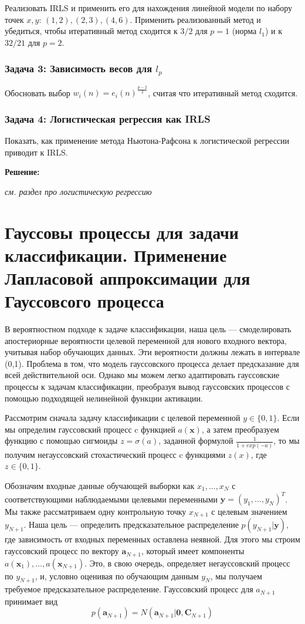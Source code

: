 Реализовать IRLS и применить его для нахождения линейной модели по набору точек $x, y$: $(1, 2), (2, 3), (4, 6)$. Применить реализованный метод и убедиться, чтобы итеративный метод сходится к $3 / 2$ для $p = 1$ (норма $l_1$) и к $32 / 21$ для $p = 2$.

\subsubsection{Задача 3: Зависимость весов для $l_p$}

Обосновать выбор $w_i(n) = e_i(n)^{\frac{p - 2}{2}}$, считая что итеративный метод сходится.

\subsubsection{Задача 4: Логистическая регрессия как IRLS}

Показать, как применение метода Ньютона-Рафсона к логистической регрессии приводит к IRLS.

\textbf{Решение:}

\textit{см. раздел про логистическую регрессию}

\section{Гауссовы процессы для задачи классификации. Применение Лапласовой аппроксимации для Гауссовсого процесса}

В вероятностном подходе к задаче классификации, наша цель — смоделировать апостериорные
вероятности целевой переменной для нового входного вектора, учитывая набор обучающих
данных. Эти вероятности должны лежать в интервале (0,1). Проблема в том, что модель гауссовского процесса делает предсказание для всей действительной оси. Однако мы можем легко
адаптировать гауссовские процессы к задачам классификации, преобразуя вывод
гауссовских процессов с помощью подходящей нелинейной функции активации.

Рассмотрим сначала задачу классификации с целевой переменной $y \in \{0,1\}$. Если мы определим гауссовский процесс c функцией $a(\mathbf{x})$, а затем преобразуем функцию с помощью сигмоиды $z=\sigma(a)$, заданной формулой $\frac{1}{1+exp(-a)}$, то мы получим негауссовский
стохастический процесс c функциями $z(x)$, где $z \in \{0,1\}$.

Обозначим входные данные обучающей выборки как $x_1,...,x_N$ с соответствующими
наблюдаемыми целевыми переменными $\mathbf{y} =(y_1,...,y_N)^T$. Мы также рассматриваем одну контрольную точку
$x_{N+1}$ с целевым значением $y_{N+1}$. Наша цель — определить предсказательное распределение
$p(y_{N+1}|\mathbf{y})$, где зависимость от входных переменных оставлена неявной. Для этого мы строим гауссовский процесс по вектору $\mathbf{a}_{N+1}$, который имеет компоненты $a(\mathbf{x}_1),...,a(\mathbf{x}_{N+1})$. Это, в свою очередь, определяет негауссовский процесс по $y_{N+1}$,
и, условно оценивая по обучающим данным $y_N$, мы получаем требуемое предсказательное распределение. Гауссовский процесс для $a_{N+1}$ принимает вид
\[ p(\mathbf{a}_{N+1})=N(\mathbf{a}_{N+1}|\mathbf{0},\mathbf{C}_{N+1})\]

